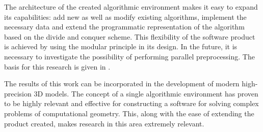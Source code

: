 \documentclass[conference]{IEEEtran}
\theoremstyle{plane}
\begin{document}
The architecture of the created algorithmic environment makes it easy to expand its capabilities: add new as well as modify existing algorithms, implement the necessary data and extend the programmatic representation of the algorithm based on the divide and conquer scheme. This flexibility of the software product is achieved by using the modular principle in its design. In the future, it is necessary to investigate the possibility of performing parallel preprocessing. The basis for this research is given in \cite{parallel_merge_sort}.

The results of this work can be incorporated in the development of modern high-precision 3D models. The concept of a single algorithmic environment has proven to be highly relevant and effective for constructing a software for solving complex problems of computational geometry. This, along with the ease of extending the product created, makes research in this area extremely relevant.
\end{document}
